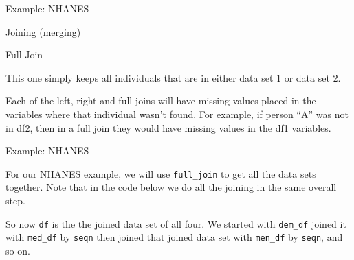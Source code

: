 \begin{frame}[fragile]{Example: NHANES}

\begin{block}{Joining (merging)}

\begin{block}{Full Join}

This one simply keeps all individuals that are in either data set 1 or
data set 2.

\begin{Shaded}
\begin{Highlighting}[]
\NormalTok{)}
\end{Highlighting}
\end{Shaded}

Each of the left, right and full joins will have missing values placed
in the variables where that individual wasn't found. For example, if
person ``A'' was not in df2, then in a full join they would have missing
values in the df1 variables.

\end{block}

\end{block}

\end{frame}

\begin{frame}[fragile]{Example: NHANES}

For our NHANES example, we will use \texttt{full\_join} to get all the
data sets together. Note that in the code below we do all the joining in
the same overall step.

\begin{Shaded}
\end{Shaded}

So now \texttt{df} is the the joined data set of all four. We started
with \texttt{dem\_df} joined it with \texttt{med\_df} by \texttt{seqn}
then joined that joined data set with \texttt{men\_df} by \texttt{seqn},
and so on.

\end{frame}

